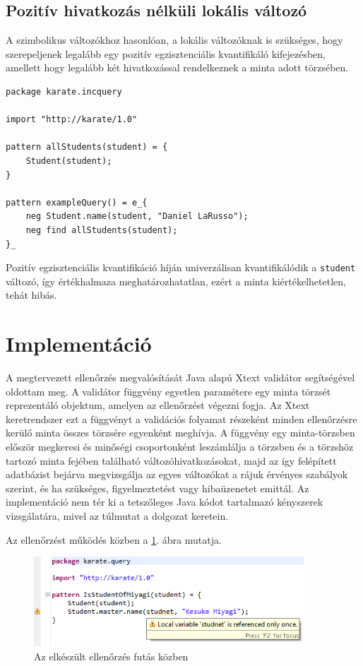 \subsection{Pozitív hivatkozás nélküli lokális változó}

A szimbolikus változókhoz hasonlóan, a lokális változóknak is szükséges, hogy szerepeljenek legalább egy pozitív egzisztenciális kvantifikáló kifejezésben, amellett hogy legalább két hivatkozással rendelkeznek a minta adott törzsében.
%
\begin{lstlisting}
package karate.incquery

import "http://karate/1.0"

pattern allStudents(student) = {
    Student(student);
}

pattern exampleQuery() = e_{
    neg Student.name(student, "Daniel LaRusso");
    neg find allStudents(student);
}_
\end{lstlisting}
%
Pozitív egzisztenciális kvantifikáció híján univerzálisan kvantifikálódik a \texttt{student} változó, így értékhalmaza meghatározhatatlan, ezért a minta kiértékelhetetlen, tehát hibás.


\section{Implementáció}

A megtervezett ellenőrzés megvalósítását Java alapú Xtext validátor segítségével oldottam meg.
A validátor függvény egyetlen paramétere egy minta törzsét reprezentáló objektum, amelyen az ellenőrzést végezni fogja.
Az Xtext keretrendszer ezt a függvényt a validációs folyamat részeként minden ellenőrzésre kerülő minta összes törzsére egyenként meghívja.
A függvény egy minta-törzsben először megkeresi és minőségi csoportonként leszámlálja a törzsben és a törzshöz tartozó minta fejében található változóhivatkozásokat, majd az így felépített adatbázist bejárva megvizsgálja az egyes változókat a rájuk érvényes szabályok szerint, és ha szükséges, figyelmeztetést vagy hibaüzenetet emittál.
Az implementáció nem tér ki a tetszőleges Java kódot tartalmazó kényszerek vizsgálatára, mivel az túlmutat a dolgozat keretein.

Az ellenőrzést működés közben a \ref{fig:unusedLive}. ábra mutatja.
\begin{figure}[htb]
\centering
\includegraphics[width=0.90\textwidth]{figures/unused-variable-detection-warning.png}
\caption{Az elkészült ellenőrzés futás közben}
\label{fig:unusedLive}
\end{figure}

